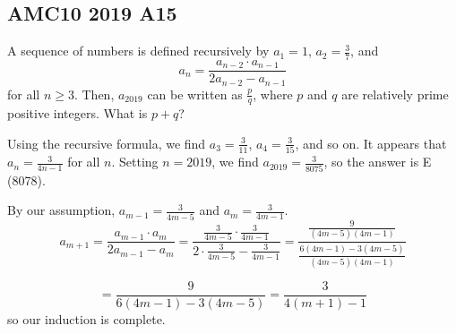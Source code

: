 \documentclass[12pt]{exam}
\begin{document}
\thispagestyle{empty}

\begin{center}\section*{AMC10 2019 A15}

\end{center}
\bigskip
\begin{questions}

\question 
A sequence of numbers is defined recursively by $a_1 = 1$, $a_2 = \frac{3}{7}$, and 
\[a_n=\frac{a_{n-2} \cdot a_{n-1}}{2a_{n-2} - a_{n-1}}\]for all $n \geq 3$.
Then, $a_{2019}$ can be written as $\frac{p}{q}$, where $p$ and $q$ are relatively prime positive integers. 
What is $p + q$?
\bigskip

\begin{oneparchoices}
\end{oneparchoices}

\vspace{0.5cm}
Using the recursive formula, we find $a_3 = \frac{3}{11}$,
$a_4 = \frac{3}{15}$, and so on. It appears that $a_n = \frac{3}{4n - 1}$
for all $n$. Setting $n = 2019$, we find $a_{2019} = \frac{3}{8075}$, so the 
answer is E (8078).

\vspace{0.5cm}
By our assumption, $a_{m-1} = \frac{3}{4m-5}$ and $a_m = \frac{3}{4m-1}$. 
\[a_{m+1} = \frac{a_{m-1} \cdot a_m}{2a_{m-1} - a_m} 
= \frac{\frac{3}{4m-5} \cdot \frac{3}{4m-1}}{2 \cdot \frac{3}{4m-5} - \frac{3}{4m-1}} 
= \frac{\frac{9}{(4m-5)(4m-1)}}{\frac{6(4m-1)-3(4m-5)}{(4m-5)(4m-1)}} 
\] 

\[ = \frac{9}{6(4m-1) - 3(4m-5)} 
= \frac{3}{4(m+1) - 1}\] so our induction is complete.


\end{questions}
\end{document}

